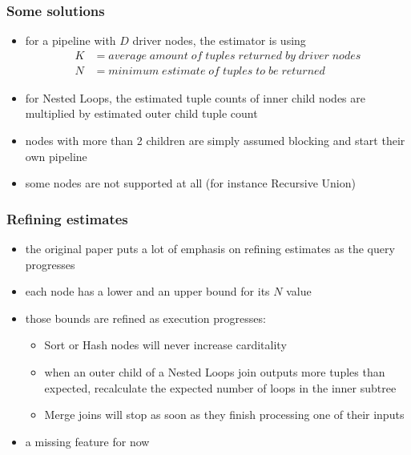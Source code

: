 \documentclass{beamer}
\begin{document}
\begin{frame}
  \frametitle{Some solutions}

  \begin{itemize}
  \item for a pipeline with $D$ driver nodes, the estimator is using
    \begin{align*}
      K &= average\;amount\;of\;tuples\;returned\;by\;driver\;nodes \\
      N &= minimum\;estimate\;of\;tuples\;to\;be\;returned
    \end{align*}
  \item for Nested Loops, the estimated tuple counts of inner child nodes are
    multiplied by estimated outer child tuple count
  \item nodes with more than 2 children are simply assumed blocking and start
    their own pipeline
  \item some nodes are not supported at all (for instance Recursive Union)
  \end{itemize}
\end{frame}

\begin{frame}
  \frametitle{Refining estimates}

  \begin{itemize}
  \item the original paper puts a lot of emphasis on refining estimates as the
    query progresses
  \item each node has a lower and an upper bound for its $N$ value
  \item those bounds are refined as execution progresses:
    \begin{itemize}
    \item Sort or Hash nodes will never increase carditality
    \item when an outer child of a Nested Loops join outputs more tuples than
      expected, recalculate the expected number of loops in the inner subtree
    \item Merge joins will stop as soon as they finish processing one of their
      inputs
    \end{itemize}
  \item a \alert{missing feature} for now
  \end{itemize}
\end{frame}
\end{document}
